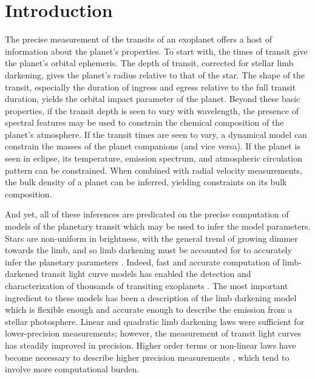 \documentclass[modern,trackchanges]{aastex63}
\begin{document}
\section{Introduction}
\label{sec:intro}

The precise measurement of the transits of an exoplanet offers a host of information
about the planet's properties.  To start with, the times of transit give
the planet's orbital ephemeris.  The depth of transit, corrected for stellar
limb darkening, gives the planet's radius relative to that of the star.   The
shape of the transit, especially the duration of ingress and egress relative to
the full transit duration, yields the orbital impact parameter of the planet.
Beyond these basic properties, if the transit depth is seen to vary with wavelength,
the presence of spectral features may be used to constrain the chemical composition
of the planet's atmosphere.  If the transit times are seen to vary, a dynamical
model can constrain the masses of the planet companions (and vice versa).  If
the planet is seen in eclipse, its temperature, emission spectrum, and atmospheric
circulation pattern can be constrained.  When combined with radial velocity
measurements, the bulk density of a planet can be inferred, yielding constraints
on its bulk composition.

And yet, all of these inferences are predicated on the precise computation of models
of the planetary transit which may be used to infer the model parameters.  Stars
are non-uniform in brightness, with the general
trend of growing dimmer towards the limb, and so limb darkening must be accounted
for to accurately infer the planetary parameters \citep{Csizmadia2018}.  Indeed, fast
and accurate computation of limb-darkened transit light curve models has enabled the
detection and characterization of thousands of transiting exoplanets \citep{MandelAgol2002}.
The most important ingredient to these models has been a description of the
limb darkening model which is flexible enough and accurate enough to describe the
emission from a stellar photosphere.  Linear and quadratic limb darkening laws
were sufficient for lower-precision measurements; however, the measurement of
transit light curves has steadily improved in precision.  Higher order terms or non-linear laws
have become necessary to describe higher precision measurements \citep{Kopal1950,Claret2000,
Gimenez2006}, which tend to involve more computational burden.
\end{document}
